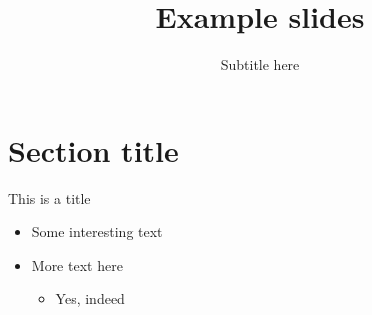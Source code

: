 \documentclass[aspectratio=1610,14pt]{beamer}
\title{Example slides}
\subtitle{Subtitle here}
\begin{document}
    \section{Section title}

    \begin{frame}{This is a title}
      \begin{itemize}
      \item Some interesting text
      \item More text here
        \begin{itemize}
        \item Yes, indeed
        \end{itemize}
      \end{itemize}
    \end{frame}
\end{document}
